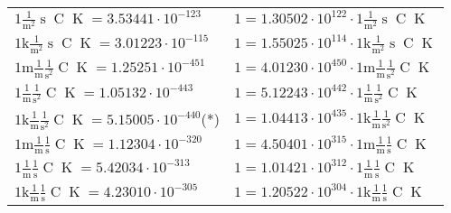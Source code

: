 \begin{center}
\begin{longtable}{l l}
{\color{black}$1 \bm{\mathrm{ }}\frac1{\operatorname{m}^2}{\operatorname{s}}{\operatorname{C}}{\operatorname{K}} = 3.53441\cdot10^{-123} $}   & {\color{black}$ 1 = 1.30502\cdot10^{122} \cdot 1 \bm{\mathrm{ }}\frac1{\operatorname{m}^2}{\operatorname{s}}{\operatorname{C}}{\operatorname{K}}$}  \\
{\color{gray}$1 \bm{\mathrm{ k}}\frac1{\operatorname{m}^2}{\operatorname{s}}{\operatorname{C}}{\operatorname{K}} = 3.01223\cdot10^{-115} $}   & {\color{gray}$ 1 = 1.55025\cdot10^{114} \cdot 1 \bm{\mathrm{ k}}\frac1{\operatorname{m}^2}{\operatorname{s}}{\operatorname{C}}{\operatorname{K}}$}  \\
{\color{gray}$1 \bm{\mathrm{ m}}\frac1{\operatorname{m}}\frac1{\operatorname{s}^2}{\operatorname{C}}{\operatorname{K}} = 1.25251\cdot10^{-451} $}   & {\color{gray}$ 1 = 4.01230\cdot10^{450} \cdot 1 \bm{\mathrm{ m}}\frac1{\operatorname{m}}\frac1{\operatorname{s}^2}{\operatorname{C}}{\operatorname{K}}$}  \\
{\color{black}$1 \bm{\mathrm{ }}\frac1{\operatorname{m}}\frac1{\operatorname{s}^2}{\operatorname{C}}{\operatorname{K}} = 1.05132\cdot10^{-443} $}   & {\color{black}$ 1 = 5.12243\cdot10^{442} \cdot 1 \bm{\mathrm{ }}\frac1{\operatorname{m}}\frac1{\operatorname{s}^2}{\operatorname{C}}{\operatorname{K}}$}  \\
{\color{gray}$1 \bm{\mathrm{ k}}\frac1{\operatorname{m}}\frac1{\operatorname{s}^2}{\operatorname{C}}{\operatorname{K}} = 5.15005\cdot10^{-440} $}\quad(*) & {\color{gray}$ 1 = 1.04413\cdot10^{435} \cdot 1 \bm{\mathrm{ k}}\frac1{\operatorname{m}}\frac1{\operatorname{s}^2}{\operatorname{C}}{\operatorname{K}}$}  \\
{\color{gray}$1 \bm{\mathrm{ m}}\frac1{\operatorname{m}}\frac1{\operatorname{s}}{\operatorname{C}}{\operatorname{K}} = 1.12304\cdot10^{-320} $}   & {\color{gray}$ 1 = 4.50401\cdot10^{315} \cdot 1 \bm{\mathrm{ m}}\frac1{\operatorname{m}}\frac1{\operatorname{s}}{\operatorname{C}}{\operatorname{K}}$}  \\
{\color{black}$1 \bm{\mathrm{ }}\frac1{\operatorname{m}}\frac1{\operatorname{s}}{\operatorname{C}}{\operatorname{K}} = 5.42034\cdot10^{-313} $}   & {\color{black}$ 1 = 1.01421\cdot10^{312} \cdot 1 \bm{\mathrm{ }}\frac1{\operatorname{m}}\frac1{\operatorname{s}}{\operatorname{C}}{\operatorname{K}}$}  \\
{\color{gray}$1 \bm{\mathrm{ k}}\frac1{\operatorname{m}}\frac1{\operatorname{s}}{\operatorname{C}}{\operatorname{K}} = 4.23010\cdot10^{-305} $}   & {\color{gray}$ 1 = 1.20522\cdot10^{304} \cdot 1 \bm{\mathrm{ k}}\frac1{\operatorname{m}}\frac1{\operatorname{s}}{\operatorname{C}}{\operatorname{K}}$}  \\

\end{longtable}
\end{center}
